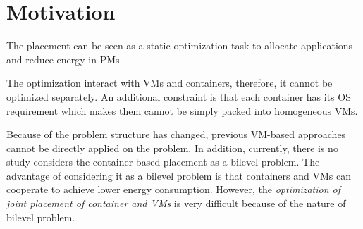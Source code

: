 
\section{Motivation}
\label{sec:motivation}


  The placement can be seen as a static optimization task to allocate applications and reduce energy in PMs. 

 The optimization interact with VMs and containers, therefore, it cannot be optimized separately. An additional constraint is that each container has its OS requirement which makes them cannot be simply packed into homogeneous VMs. 

 Because of the problem structure has changed, previous VM-based approaches cannot be directly applied on the problem. In addition, currently, there is no study considers the container-based placement as a bilevel problem. The advantage of considering it as a bilevel problem is that containers and VMs can cooperate to achieve lower energy consumption. However, the \emph{optimization of joint placement of container and VMs} is very difficult because of the nature of bilevel problem.

